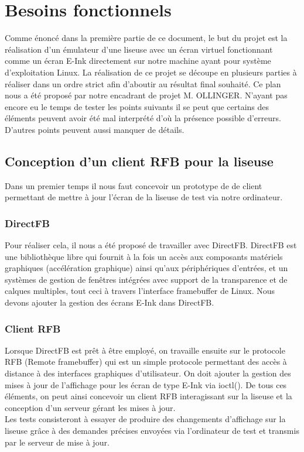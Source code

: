 \chapter{Besoins fonctionnels}

Comme énoncé dans la première partie de ce document, le but du projet est la réalisation d'un émulateur d'une liseuse avec un écran virtuel fonctionnant comme un écran E-Ink directement sur notre machine ayant pour système d'exploitation Linux. La réalisation de ce projet se découpe en plusieurs parties à réaliser dans un ordre strict afin d'aboutir au résultat final souhaité. Ce plan nous a été proposé par notre encadrant de projet M. OLLINGER. N'ayant pas encore eu le temps de tester les points suivants il se peut que certains des éléments peuvent avoir été mal interprété d'où la présence possible d'erreurs. D'autres points peuvent aussi manquer de détails.

\section{Conception d'un client RFB pour la liseuse}

Dans un premier temps il nous faut concevoir un prototype de de client permettant de mettre à jour l'écran de la liseuse de test via notre ordinateur.

\subsection{DirectFB}
Pour réaliser cela, il nous a été proposé de travailler avec DirectFB. DirectFB est une bibliothèque libre qui fournit à la fois un accès aux composants matériels graphiques (accélération graphique) ainsi qu'aux périphériques d'entrées, et un systèmes de gestion de fenêtres intégrées avec support de la transparence et de calques multiples, tout ceci à travers l'interface framebuffer de Linux. Nous devons ajouter la gestion des écrans E-Ink dans DirectFB. 
 
\subsection{Client RFB}
Lorsque DirectFB est prêt à être employé, on travaille ensuite sur le protocole RFB (Remote framebuffer) qui est un simple protocole permettant des accès à distance à des interfaces graphiques d'utilisateur. On doit ajouter la gestion des mises à jour de l'affichage pour les écran de type E-Ink via ioctl(). De tous ces éléments, on peut ainsi concevoir un client RFB interagissant sur la liseuse et la conception d'un serveur gérant les mises à jour.
\\Les tests consisteront à essayer de produire des changements d'affichage sur la liseuse grâce à des demandes précises envoyées via l'ordinateur de test et transmis par le serveur de mise à jour. 


